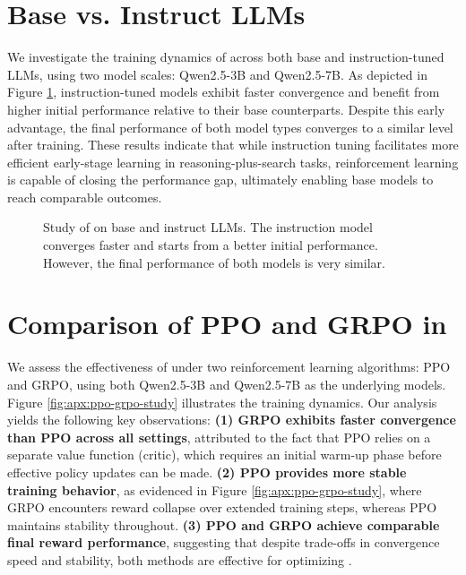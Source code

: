 \section{Base vs. Instruct LLMs}\label{sec:appendix:base-instruct}

We investigate the training dynamics of \Ours across both base and instruction-tuned LLMs, using two model scales: Qwen2.5-3B and Qwen2.5-7B.
As depicted in Figure \ref{fig:apx:base-instruct}, instruction-tuned models exhibit faster convergence and benefit from higher initial performance relative to their base counterparts.
Despite this early advantage, the final performance of both model types converges to a similar level after training.
These results indicate that while instruction tuning facilitates more efficient early-stage learning in reasoning-plus-search tasks, reinforcement learning is capable of closing the performance gap, ultimately enabling base models to reach comparable outcomes.

\begin{figure}[h]
    \centering
    
    \hspace{0.3in}
    \caption{Study of \Ours on base and instruct LLMs. The instruction model converges faster and starts from a better initial performance. However, the final performance of both models is very similar.}\label{fig:apx:base-instruct}
\end{figure}

\section{Comparison of PPO and GRPO in \Ours}\label{sec:appendix:ppo-grpo}

We assess the effectiveness of \Ours under two reinforcement learning algorithms: PPO and GRPO, using both Qwen2.5-3B and Qwen2.5-7B as the underlying models.
Figure \ref{fig:apx:ppo-grpo-study} illustrates the training dynamics.
Our analysis yields the following key observations:
\textbf{(1) GRPO exhibits faster convergence than PPO across all settings}, attributed to the fact that PPO relies on a separate value function (critic), which requires an initial warm-up phase before effective policy updates can be made.
\textbf{(2) PPO provides more stable training behavior}, as evidenced in Figure \ref{fig:apx:ppo-grpo-study}, where GRPO encounters reward collapse over extended training steps, whereas PPO maintains stability throughout.
\textbf{(3) PPO and GRPO achieve comparable final reward performance}, suggesting that despite trade-offs in convergence speed and stability, both methods are effective for optimizing \Ours.


